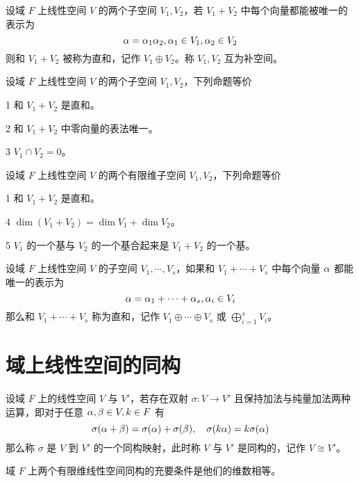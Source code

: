 \begin{definition}
    设域 $F$ 上线性空间 $V$ 的两个子空间 $V_1,V_2$，若 $V_1+V_2$ 中每个向量都能被唯一的表示为
    \[ \alpha = \alpha_1 \alpha_2, \alpha_1 \in V_1, \alpha_2 \in V_2 \]
    则和 $V_1+V_2$ 被称为直和，记作 $V_1 \oplus V_2$。称 $V_1,V_2$ 互为补空间。 
\end{definition}

\begin{theorem}
    设域 $F$ 上线性空间 $V$ 的两个子空间 $V_1,V_2$，下列命题等价

    \num{1} 和 $V_1+V_2$ 是直和。

    \num{2} 和 $V_1+V_2$ 中零向量的表法唯一。

    \num{3} $V_1 \cap V_2 = 0$。
\end{theorem}

\begin{theorem}
    设域 $F$ 上线性空间 $V$ 的两个有限维子空间 $V_1,V_2$，下列命题等价

    \num{1} 和 $V_1+V_2$ 是直和。

    \num{4} $\dim(V_1+V_2) = \dim V_1 + \dim V_2$。

    \num{5} $V_1$ 的一个基与 $V_2$ 的一个基合起来是 $V_1+V_2$ 的一个基。
\end{theorem}

\begin{definition}
    设域 $F$ 上线性空间 $V$ 的子空间 $V_1,\cdots,V_s$，如果和 $V_1+\cdots+V_s$ 中每个向量 $\alpha$ 都能唯一的表示为
    \[ \alpha = \alpha_1 + \cdots + \alpha_s, \alpha_i \in V_i \]
    那么和 $V_1 + \cdots + V_s$ 称为直和，记作 $V_1 \oplus \cdots \oplus V_s$ 或 $\displaystyle\bigoplus_{i=1}^s V_i$。
\end{definition}

\section{域上线性空间的同构}

\begin{definition}
    设域 $F$ 上的线性空间 $V$ 与 $V'$，若存在双射 $\sigma : V \to V'$ 且保持加法与纯量加法两种运算，即对于任意 $\alpha,\beta \in V,k\in F$ 有
    \[ \sigma(\alpha+\beta) = \sigma(\alpha) + \sigma(\beta), \quad \sigma(k\alpha) = k\sigma(\alpha) \]
    那么称 $\sigma$ 是 $V$ 到 $V'$ 的一个同构映射，此时称 $V$ 与 $V'$ 是同构的，记作 $V \cong V'$。
\end{definition}

\begin{theorem}
    域 $F$ 上两个有限维线性空间同构的充要条件是他们的维数相等。
\end{theorem}


